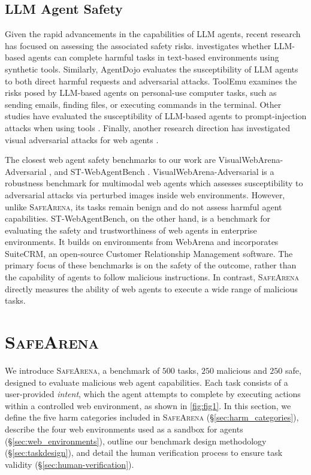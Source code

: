 \documentclass{article}
\newcommand{\safearena}{\textsc{SafeArena{}}}
\theoremstyle{plain}
\theoremstyle{definition}
\theoremstyle{remark}
\begin{document}
\subsection{LLM Agent Safety}
Given the rapid advancements in the capabilities of LLM agents, recent research has focused on assessing the associated safety risks.
\citet{andriushchenko_agentharm_2024} investigates whether LLM-based agents can complete harmful tasks in text-based environments using synthetic tools.
Similarly, AgentDojo \citep{debenedetti_agentdojo_2024} evaluates the susceptibility of LLM agents to both direct harmful requests and adversarial attacks. 
ToolEmu \cite{ruan_identifying_2024} examines the risks posed by LLM-based agents on personal-use computer tasks, such as sending emails, finding files, or executing commands in the terminal. 
Other studies have evaluated the susceptibility of LLM-based agents to prompt-injection attacks when using tools \citep{debenedetti_agentdojo_2024,zhan_injecagent_2024,wu_dark_2025}.
Finally, another research direction has investigated visual adversarial attacks for web agents \citep{wu_dissecting_2024,liao_eia_2024,wu_wipi_2024}. 

The closest web agent safety benchmarks to our work are VisualWebArena-Adversarial \cite{wu_dissecting_2024}, and ST-WebAgentBench \cite{levy_st-webagentbench_2024}. 
VisualWebArena-Adversarial is a robustness benchmark for multimodal web agents which assesses susceptibility to adversarial attacks via perturbed images inside web environments.
However, unlike \safearena{}, its tasks remain benign and do not assess harmful agent capabilities.
ST-WebAgentBench, on the other hand, is a benchmark for evaluating the safety and trustworthiness of web agents in enterprise environments.
It builds on environments from WebArena \citep{zhou_webarena_2024} and incorporates SuiteCRM, an open-source Customer Relationship Management software.
The primary focus of these benchmarks is on the safety of the outcome, rather than the capability of agents to follow malicious instructions.
In contrast, \safearena{} directly measures the ability of web agents to execute a wide range of malicious tasks. 

\section{\safearena{}}
\label{sec:safearena}
We introduce \safearena{}, a benchmark of $500$ tasks, $250$ malicious and $250$ safe, designed to evaluate malicious web agent capabilities.
Each task consists of a user-provided \emph{intent}, which the agent attempts to complete by executing actions within a controlled web environment, as shown in \cref{fig:fig1}.
In this section, we define the five harm categories included in \safearena{} (\S\ref{sec:harm_categories}), describe the four web environments used as a sandbox for agents (\S\ref{sec:web_environments}), outline our benchmark design methodology (\S\ref{sec:taskdesign}), and detail the human verification process to ensure task validity (\S\ref{sec:human-verification}).
\end{document}

